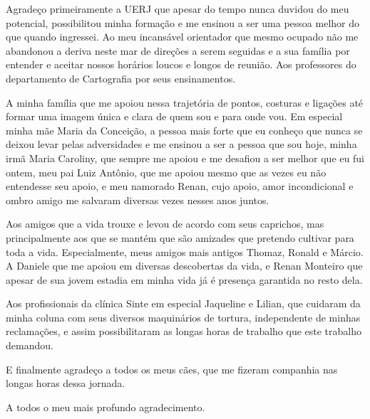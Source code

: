
Agradeço primeiramente a UERJ que apesar do tempo nunca duvidou do meu potencial, possibilitou minha formação e me ensinou a ser uma pessoa melhor do que quando ingressei. Ao meu incansável orientador que mesmo ocupado não me abandonou a deriva neste mar de direções a serem seguidas e a sua família por entender e aceitar nossos horários loucos e longos de reunião. Aos professores do departamento de Cartografia por seus ensinamentos.

A minha família que me apoiou nessa trajetória de pontos, costuras e ligações até formar uma imagem única e clara de quem sou e para onde vou. Em especial minha mãe Maria da Conceição, a pessoa mais forte que eu conheço que nunca se deixou levar pelas adversidades e me ensinou a ser a pessoa que sou hoje, minha irmã Maria Caroliny, que sempre me apoiou e me desafiou a ser melhor que eu fui ontem, meu pai Luiz Antônio, que me apoiou mesmo que as vezes eu não entendesse seu apoio, e meu namorado Renan, cujo apoio, amor incondicional e ombro amigo me salvaram diversas vezes nesses anos juntos.

Aos amigos que a vida trouxe e levou de acordo com seus caprichos, mas principalmente aos que se mantém que são amizades que pretendo cultivar para toda a vida. Especialmente, meus amigos mais antigos Thomaz, Ronald e Márcio. A Daniele que me apoiou em diversas descobertas da vida, e Renan Monteiro que apesar de sua jovem estadia em minha vida já é presença garantida no resto dela.

Aos profissionais da clínica Sinte em especial Jaqueline e Lilian, que cuidaram da minha coluna com seus diversos maquinários de tortura, independente de minhas reclamações, e assim possibilitaram as longas horas de trabalho que este trabalho demandou.

E finalmente agradeço a todos os meus cães, que me fizeram companhia nas longas horas dessa jornada.

A todos o meu mais profundo agradecimento.